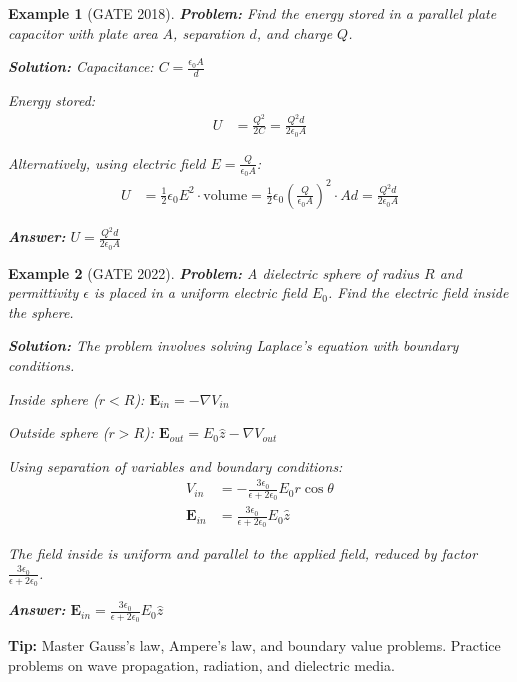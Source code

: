 \documentclass[12pt,a4paper]{article}
\newtheorem{example}{Example}[section]
\newcommand{\ans}[1]{\textcolor{red!70!black}{\textbf{Answer:} #1}}
\newcommand{\sol}{\textcolor{blue!70!black}{\textbf{Solution:}}}
\newcommand{\tip}[1]{\textcolor{green!60!black}{\textbf{Tip:} #1}}
\begin{document}
\begin{example}[GATE 2018]
\textbf{Problem:} Find the energy stored in a parallel plate capacitor with plate area $A$, separation $d$, and charge $Q$.

\sol
Capacitance: $C = \frac{\epsilon_0 A}{d}$

Energy stored:
\begin{align}
U &= \frac{Q^2}{2C} = \frac{Q^2 d}{2\epsilon_0 A}
\end{align}

Alternatively, using electric field $E = \frac{Q}{\epsilon_0 A}$:
\begin{align}
U &= \frac{1}{2}\epsilon_0 E^2 \cdot \text{volume} = \frac{1}{2}\epsilon_0 \left(\frac{Q}{\epsilon_0 A}\right)^2 \cdot Ad = \frac{Q^2 d}{2\epsilon_0 A}
\end{align}

\ans{$U = \frac{Q^2 d}{2\epsilon_0 A}$}
\end{example}

\begin{example}[GATE 2022]
\textbf{Problem:} A dielectric sphere of radius $R$ and permittivity $\epsilon$ is placed in a uniform electric field $E_0$. Find the electric field inside the sphere.

\sol
The problem involves solving Laplace's equation with boundary conditions.

Inside sphere ($r < R$): $\mathbf{E}_{in} = -\nabla V_{in}$

Outside sphere ($r > R$): $\mathbf{E}_{out} = E_0\hat{z} - \nabla V_{out}$

Using separation of variables and boundary conditions:
\begin{align}
V_{in} &= -\frac{3\epsilon_0}{\epsilon + 2\epsilon_0}E_0 r\cos\theta\\
\mathbf{E}_{in} &= \frac{3\epsilon_0}{\epsilon + 2\epsilon_0}E_0\hat{z}
\end{align}

The field inside is uniform and parallel to the applied field, reduced by factor $\frac{3\epsilon_0}{\epsilon + 2\epsilon_0}$.

\ans{$\mathbf{E}_{in} = \frac{3\epsilon_0}{\epsilon + 2\epsilon_0}E_0\hat{z}$}
\end{example}

\tip{Master Gauss's law, Ampere's law, and boundary value problems. Practice problems on wave propagation, radiation, and dielectric media.}

\end{document}
